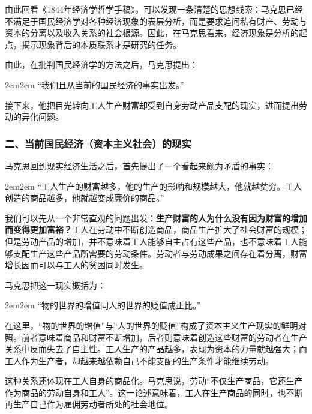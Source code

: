 \documentclass[a4paper,twoside,12pt,AutoFakeBold]{ctexart}
\begin{document}
由此回看《1844年经济学哲学手稿》，可以发现一条清楚的思想线索：马克思已经不满足于国民经济学对各种经济现象的表层分析，而是要求追问私有财产、劳动与资本的分离以及收入关系的社会根源。因此，在马克思看来，经济现象是分析的起点，揭示现象背后的本质联系才是研究的任务。

由此，在批判国民经济学的方法之后，马克思提出：

\begin{adjustwidth}{2em}{2em}
\qquad\fangsong
“我们且从当前的国民经济的事实出发。”
\end{adjustwidth}

接下来，他把目光转向工人生产财富却受到自身劳动产品支配的现实，进而提出劳动的异化问题。

\subsubsection{二、当前国民经济（资本主义社会）的现实}\label{sec:3.2}

马克思回到现实经济生活之后，首先提出了一个看起来颇为矛盾的事实：

\begin{adjustwidth}{2em}{2em}
\qquad\fangsong
“工人生产的财富越多，他的生产的影响和规模越大，他就越贫穷。工人创造的商品越多，他就越变成廉价的商品。”
\end{adjustwidth}

我们可以先从一个非常直观的问题出发：\textbf{生产财富的人为什么没有因为财富的增加而变得更加富裕？}工人在劳动中不断创造商品，商品生产扩大了社会财富的规模；但是劳动产品的增加，并不意味着工人能够自主占有这些产品，也不意味着工人能够支配生产这些产品所需要的劳动条件。劳动者与劳动成果之间存在着分离，财富增长因而可以与工人的贫困同时发生。

马克思把这一现实概括为：

\begin{adjustwidth}{2em}{2em}
\qquad\fangsong
“物的世界的增值同人的世界的贬值成正比。”
\end{adjustwidth}

在这里，“物的世界的增值”与“人的世界的贬值”构成了资本主义生产现实的鲜明对照。前者意味着商品和财富不断增加，后者则意味着创造这些财富的劳动者在生产关系中反而失去了自主性。工人生产的产品越多，表现为资本的力量就越强大；而工人作为生产者，却越来越依赖自己不能支配的生产条件才能继续劳动。

这种关系还体现在工人自身的商品化。马克思说，劳动“不仅生产商品，它还生产作为商品的劳动自身和工人”。这一论述意味着，工人在生产商品的同时，也不断再生产自己作为雇佣劳动者所处的社会地位。
\end{document}
